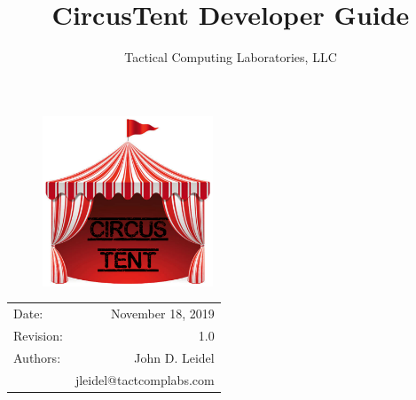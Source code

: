 \documentclass{article}
\title{CircusTent Developer Guide} %
\author{Tactical Computing Laboratories, LLC} %
\date{} %
\begin{document}
\begin{figure}
\begin{center}
\includegraphics[width=2in]{figures/circus_tent.png} %
\end{center}
\end{figure}

\maketitle %
\thispagestyle{fancy} %

\begin{center}
\begin{tabular}{l r}
Date: & November 18, 2019 \\ %
Revision: & 1.0 \\         %
Authors: & John D. Leidel\\ %
& jleidel@tactcomplabs.com\\
\end{tabular}
\end{center}



\clearpage
\tableofcontents
\clearpage


\clearpage
\listoffigures
\lstlistoflistings
\listoftables
\clearpage
\end{document}
